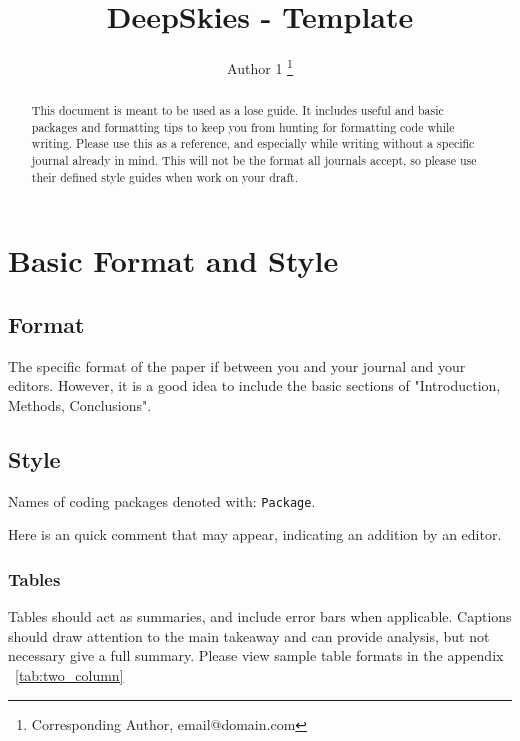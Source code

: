 \documentclass[twocolumn]{aastex631}
\newcommand{\editor}[1]{{\color{purple} #1}}
\begin{document}
\title{DeepSkies - Template} %

\author{Author 1 \thanks{Corresponding Author, email@domain.com}}


\begin{abstract}
    This document is meant to be used as a lose guide.
    It includes useful and basic packages and formatting tips to keep you from hunting for formatting code while writing.
    Please use this as a reference, and especially while writing without a specific journal already in mind.
    This will not be the format all journals accept, so please use their defined style guides when work on your draft.
\end{abstract}

\section{Basic Format and Style}

\subsection{Format}

The specific format of the paper if between you and your journal and your editors.
However, it is a good idea to include the basic sections of "Introduction, Methods, Conclusions".

\subsection{Style}

Names of coding packages denoted with: \texttt{Package}.



\editor{Here is an quick comment that may appear, indicating an addition by an editor.}

\subsubsection{Tables}

Tables should act as summaries, and include error bars when applicable. Captions should draw attention to the main takeaway and can provide analysis, but not necessary give a full summary.
Please view sample table formats in the appendix ~\ref{tab:two_column}
\end{document}
